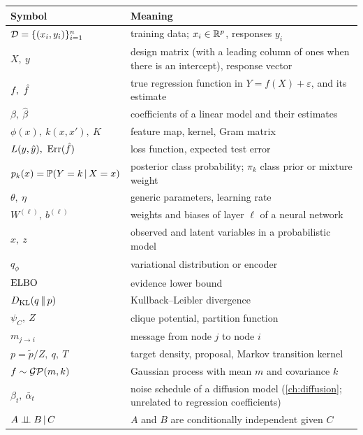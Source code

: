 \begin{center}
\small
\begin{tabularx}{\textwidth}{@{}l>{\raggedright\arraybackslash}X@{}}
\toprule
Symbol & Meaning \\
\midrule
$\mathcal{D}=\{(x_i,y_i)\}_{i=1}^n$ & training data; $x_i\in\mathbb{R}^p$, responses $y_i$ \\
$X,\ y$ & design matrix (with a leading column of ones when there is an intercept), response vector \\
$f,\ \hatf$ & true regression function in $Y=f(X)+\varepsilon$, and its estimate \\
$\beta,\ \hat\beta$ & coefficients of a linear model and their estimates \\
$\phi(x),\ k(x,x'),\ K$ & feature map, kernel, Gram matrix \\
$L(y,\hat y),\ \Err(\hatf)$ & loss function, expected test error \\
$p_k(x)=\mathbb{P}(Y=k\,|\, X=x)$ & posterior class probability; $\pi_k$ class prior or mixture weight \\
$\theta,\ \eta$ & generic parameters, learning rate \\
$W^{(\ell)},\ b^{(\ell)}$ & weights and biases of layer $\ell$ of a neural network \\
$x,\ z$ & observed and latent variables in a probabilistic model \\
$q_\phi$ & variational distribution or encoder \\
$\operatorname{ELBO}$ & evidence lower bound \\
$D_{\mathrm{KL}}(q\,\|\,p)$ & Kullback--Leibler divergence \\
$\psi_C,\ Z$ & clique potential, partition function \\
$m_{j\to i}$ & message from node $j$ to node $i$ \\
$p=\tilde p/Z,\ q,\ T$ & target density, proposal, Markov transition kernel \\
$f\sim\mathcal{GP}(m,k)$ & Gaussian process with mean $m$ and covariance $k$ \\
$\beta_t,\ \bar\alpha_t$ & noise schedule of a diffusion model (\cref{ch:diffusion}; unrelated to regression coefficients) \\
$A\perp\!\!\!\perp B\,|\, C$ & $A$ and $B$ are conditionally independent given $C$ \\
\bottomrule
\end{tabularx}
\end{center}
